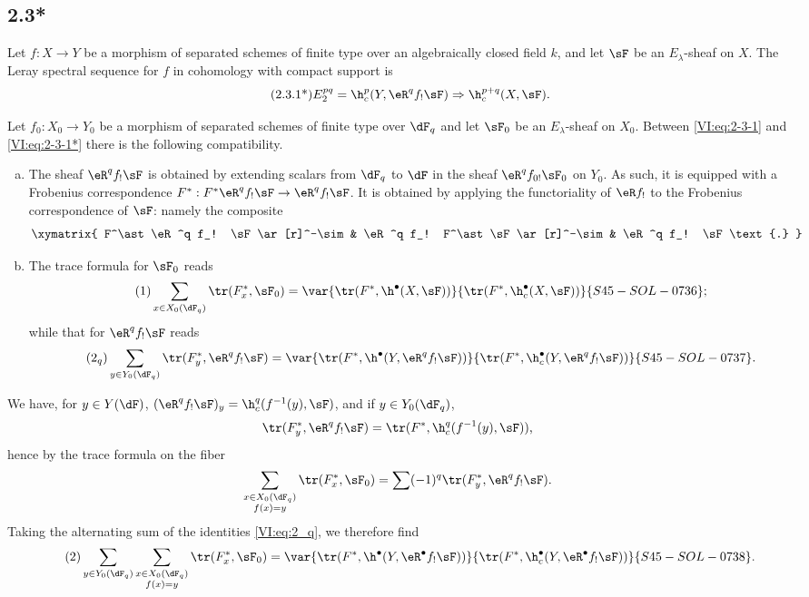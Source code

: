 \subsection*{2.3*}\label{VI:2-3*}

Let $f:X\to Y$ be a morphism of separated schemes of finite type over an 
algebraically closed field $k$, and let $\sF$ be an $E_\lambda$-sheaf on $X$. The 
Leray spectral sequence for $f$ in cohomology with compact support is 
\begin{align*}\tag{2.3.1*}\label{VI:eq:2-3-1*}
  E_2^{p q} = \h_c^p(Y,\eR^q f_! \sF) \Rightarrow \h_c^{p+q}(X,\sF) \text{.}
\end{align*}

Let $f_0:X_0 \to Y_0$ be a morphism of separated schemes of finite type over 
$\dF_q$ and let $\sF_0$ be an $E_\lambda$-sheaf on $X_0$. Between 
\eqref{VI:eq:2-3-1} and \eqref{VI:eq:2-3-1*} there is the following compatibility. 

\begin{enumerate}[a)]
  \item The sheaf $\eR^q f_! \sF$ is obtained by extending scalars from 
    $\dF_q$ to $\dF$ in the sheaf $\eR^q f_{0!} \sF_0$ on $Y_0$. As 
    such, it is equipped with a Frobenius correspondence 
    $F^\ast:F^\ast\eR^q f_! \sF \to \eR^q f_! \sF$. It is obtained by applying 
    the functoriality of $\eR f_!$ to the Frobenius correspondence of $\sF$: 
    namely the composite 
    \[\xymatrix{
      F^\ast \eR^q f_! \sF \ar[r]^-\sim 
        & \eR^q f_! F^\ast \sF \ar[r]^-\sim 
        & \eR^q f_! \sF \text{.}
    }\]
  \item The trace formula for $\sF_0$ reads 
    \begin{align*}\tag{1}\label{VI:eq:1}
      \sum_{x\in X_0(\dF_q)} \tr(F_x^\ast,\sF_0) = \var{\tr(F^\ast,\h^\bullet(X,\sF))}{\tr(F^\ast,\h_c^\bullet(X,\sF))}{S45-SOL-0736} \text{;}
    \end{align*}
    while that for $\eR^q f_! \sF$ reads 
    \begin{align*}\tag{2$_q$}\label{VI:eq:2_q} 
      \sum_{y\in Y_0(\dF_q)} \tr(F_y^\ast,\eR^q f_! \sF) = \var{\tr(F^\ast, \h^\bullet(Y,\eR^q f_! \sF))}{\tr(F^\ast,\h_c^\bullet(Y,\eR^q f_! \sF))}{S45-SOL-0737} \text{.}
    \end{align*}
\end{enumerate}

We have, for $y\in Y(\dF)$, $(\eR^q f_! \sF)_y = \h_c^q(f^{-1}(y),\sF)$, and if 
$y\in Y_0(\dF_q)$, 
\[
  \tr(F_y^\ast,\eR^q f_! \sF) = \tr(F^\ast,\h_c^q(f^{-1}(y),\sF)) \text{,}
\]
hence by the trace formula on the fiber 
\[
  \sum_{\substack{x\in X_0(\dF_q) \\ f(x) = y}} \tr(F_x^\ast,\sF_0) = \sum (-1)^q \tr(F_y^\ast,\eR^q f_! \sF) \text{.}
\]
Taking the alternating sum of the identities \eqref{VI:eq:2_q}, we therefore find 
\begin{align*}\tag{2}\label{VI:eq:2}
  \sum_{y\in Y_0(\dF_q)} \sum_{\substack{x \in X_0(\dF_q) \\ f(x) = y}} \tr(F_x^\ast,\sF_0) = \var{\tr(F^\ast,\h^\bullet(Y,\eR^\bullet f_! \sF))}{\tr(F^\ast,\h_c^\bullet(Y,\eR^\bullet f_! \sF))}{S45-SOL-0738} \text{.}
\end{align*}

